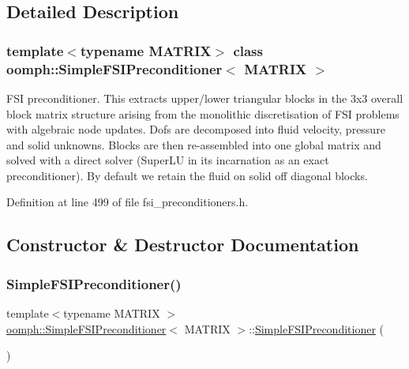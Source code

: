 \subsection{Detailed Description}
\subsubsection*{template$<$typename M\+A\+T\+R\+IX$>$\newline
class oomph\+::\+Simple\+F\+S\+I\+Preconditioner$<$ M\+A\+T\+R\+I\+X $>$}

F\+SI preconditioner. This extracts upper/lower triangular blocks in the 3x3 overall block matrix structure arising from the monolithic discretisation of F\+SI problems with algebraic node updates. Dofs are decomposed into fluid velocity, pressure and solid unknowns. Blocks are then re-\/assembled into one global matrix and solved with a direct solver (Super\+LU in its incarnation as an exact preconditioner). By default we retain the fluid on solid off diagonal blocks. 

Definition at line 499 of file fsi\+\_\+preconditioners.\+h.



\subsection{Constructor \& Destructor Documentation}
\mbox{\label{classoomph_1_1SimpleFSIPreconditioner_a597c5d3292b1e5e9001f8a738f186a73}} 
\subsubsection{\texorpdfstring{Simple\+F\+S\+I\+Preconditioner()}{SimpleFSIPreconditioner()}\hspace{0.1cm}{\footnotesize\ttfamily [1/2]}}
{\footnotesize\ttfamily template$<$typename M\+A\+T\+R\+IX $>$ \\
\hyperlink{classoomph_1_1SimpleFSIPreconditioner}{oomph\+::\+Simple\+F\+S\+I\+Preconditioner}$<$ M\+A\+T\+R\+IX $>$\+::\hyperlink{classoomph_1_1SimpleFSIPreconditioner}{Simple\+F\+S\+I\+Preconditioner} (\begin{DoxyParamCaption}{ }\end{DoxyParamCaption})\hspace{0.3cm}{\ttfamily [inline]}}



